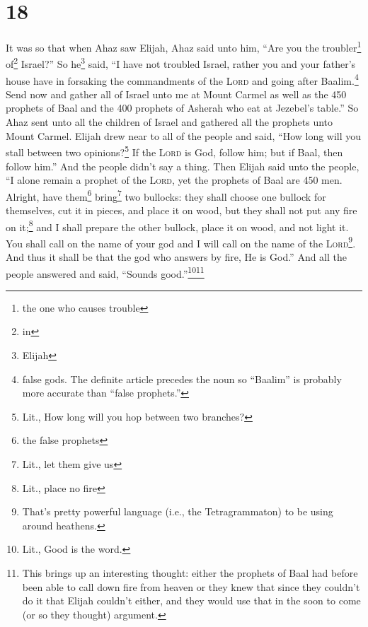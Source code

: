 \section{18}\label{1 Kings 18}
\begin{enumerate}[align=center]
     It was so that when Ahaz saw Elijah, Ahaz said unto him, ``Are you the troubler\footnote{the one who causes trouble} of\footnote{in} Israel?''%
     So he\footnote{Elijah} said, ``I have not troubled Israel, rather you and your father's house have in forsaking the commandments of the \textsc{Lord} and going after Baalim.\footnote{false gods. The definite article precedes the noun so ``Baalim'' is probably more accurate than ``false prophets.''}%
     Send now and gather all of Israel unto me at Mount Carmel as well as the 450 prophets of Baal and the 400 prophets of Asherah who eat at Jezebel's table.''%
     So Ahaz sent unto all the children of Israel and gathered all the prophets unto Mount Carmel.%
     Elijah drew near to all of the people and said, ``How long will you stall between two opinions?\footnote{Lit., How long will you hop between two branches?} If the \textsc{Lord} is God, follow him; but if Baal, then follow him.'' And the people didn't say a thing.%
     Then Elijah said unto the people, ``I alone remain a prophet of the \textsc{Lord}, yet the prophets of Baal are 450 men.%
     Alright, have them\footnote{the false prophets} bring\footnote{Lit., let them give us} two bullocks: they shall choose one bullock for themselves, cut it in pieces, and place it on wood, but they shall not put any fire on it;\footnote{Lit., place no fire} and I shall prepare the other bullock, place it on wood, and not light it.%
     You shall call on the name of your god and I will call on the name of the \textsc{Lord}\footnote{That's pretty powerful language (i.e., the Tetragrammaton) to be using around heathens.}. And thus it shall be that the god who answers by fire, He is God.'' And all the people answered and said, ``Sounds good.''\footnote{Lit., Good is the word.}\footnote{This brings up an interesting thought: either the prophets of Baal had before been able to call down fire from heaven or they knew that since they couldn't do it that Elijah couldn't either, and they would use that in the soon to come (or so they thought) argument.}%

\end{enumerate}
